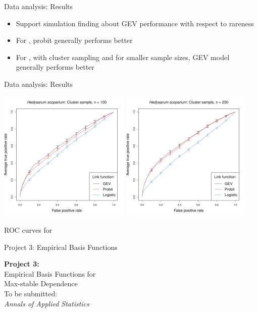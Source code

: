 \documentclass{beamer}
\begin{document}
\begin{frame}{Data analysis: Results}
	\begin{itemize} \setlength{\itemsep}{1em}
		\item Support simulation finding about GEV performance with respect to rareness
		\item For \tamarix{}, probit generally performs better
		\item For \hedysarum{}, with cluster sampling and for smaller sample sizes, GEV model generally performs better
	\end{itemize}
\end{frame}

\begin{frame}{Data analysis: Results}
	\begin{center}
		\includegraphics[width=0.47\textwidth]{data-perf-species2-100-clu}
		\includegraphics[width=0.47\textwidth]{data-perf-species2-250-clu}

		ROC curves for \hedysarum{}
	\end{center}
\end{frame}

\begin{frame}{Project 3: Empirical Basis Functions}
	\begin{center}
		\LARGE
		\textbf{Project 3:}\\ [1em]
		Empirical Basis Functions for \\
		Max-stable Dependence\\ [2em]
		\normalsize
		To be submitted:\\
		\emph{Annals of Applied Statistics}
	\end{center}
\end{frame}
\end{document}
